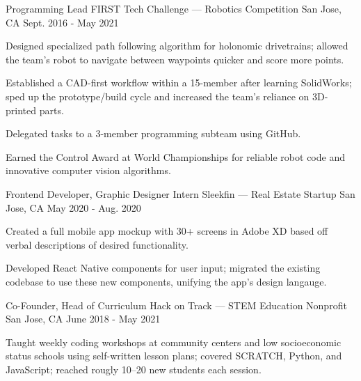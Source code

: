 
\begin{cventries}
  \cventry
  {Programming Lead} %
  {FIRST Tech Challenge --- Robotics Competition} %
  {San Jose, CA} %
  {Sept. 2016 - May 2021} %
  {
    \begin{cvitems} %
      \item {Designed specialized path following algorithm for holonomic drivetrains; allowed the team's robot to navigate between waypoints quicker and score more points.}
      \item {Established a CAD-first workflow within a 15-member after learning SolidWorks; sped up the prototype/build cycle and increased the team's reliance on 3D-printed parts.}
      \item {Delegated tasks to a 3-member programming subteam using GitHub.}
      \item {Earned the Control Award at World Championships for reliable robot code and innovative computer vision algorithms.}
    \end{cvitems}
  }

  \cventry
  {Frontend Developer, Graphic Designer Intern} %
  {Sleekfin --- Real Estate Startup} %
  {San Jose, CA} %
  {May 2020 - Aug. 2020} %
  {
    \begin{cvitems} %
      \item {Created a full mobile app mockup with 30+ screens in Adobe XD based off verbal descriptions of desired functionality.}
      \item {Developed React Native components for user input; migrated the existing codebase to use these new components, unifying the app's design langauge.}
    \end{cvitems}
  }

  \cventry
  {Co-Founder, Head of Curriculum} %
  {Hack on Track --- STEM Education Nonprofit} %
  {San Jose, CA} %
  {June 2018 - May 2021} %
  {
    \begin{cvitems} %
      \item {Taught weekly coding workshops at community centers and low socioeconomic status schools using self-written lesson plans; covered SCRATCH, Python, and JavaScript; reached rougly 10--20 new students each session.}
    \end{cvitems}
  }
\end{cventries}
